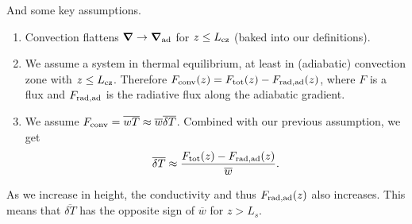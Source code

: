 \documentclass[12pt,preprint]{article}
\renewcommand{\vec}[1]{\boldsymbol{#1}}
\newcommand{\grad}{\vec{\nabla}}
\begin{document}
And some key assumptions.
\begin{enumerate}
\item Convection flattens $\grad \rightarrow \grad_{\rm{ad}}$ for $z \leq L_{\rm{cz}}$ (baked into our definitions).
\item We assume a system in thermal equilibrium, at least in (adiabatic) convection zone with $z \leq L_{\rm{cz}}$.
Therefore $F_{\rm{conv}}(z) = F_{\rm{tot}}(z) - F_{\rm{rad, ad}}(z)$, where $F$ is a flux and $F_{\rm{rad, ad}}$ is the radiative flux along the adiabatic gradient.
\item We assume $F_{\rm{conv}} = \overline{w T} \approx \overline{w}\overline{\delta T}$.
Combined with our previous assumption, we get
\begin{equation}
\overline{\delta T} \approx \frac{F_{\rm{tot}}(z) - F_{\rm{rad, ad}}(z)}{\overline{w}}.
\label{eqn:dT_assumption}
\end{equation}
\end{enumerate}
As we increase in height, the conductivity and thus $F_{\rm{rad, ad}}(z)$ also increases.
This means that $\overline{\delta T}$ has the opposite sign of $\overline{w}$ for $z > L_s$.
\end{document}
